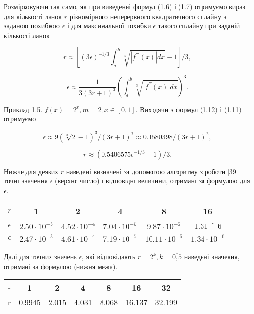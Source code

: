\documentclass[ukrainian,14pt]{extarticle}
\begin{document}
Розмірковуючи так само, як при виведенні формул (1.6) і (1.7) отримуємо вираз для кількості ланок $r$ рівномірного неперервного квадратичного сплайну з заданою похибкою $\epsilon$ і для максимальної похибки $\epsilon$ такого сплайну при заданій кількості ланок

$$r \approx \left[  (3\epsilon)^{-1/3} \int_a^b \sqrt[3]{|f^{'''}(x)| dx} - 1   \right] / 3 ,$$

$$\epsilon \approx \frac{1}{3(3r + 1)^3} \left( \int_a^b \sqrt[3]{|f^{'''}(x)| dx} \right)^3.$$

Приклад 1.5. $f(x) = 2^x, m = 2, x \in [0,1].$ Виходячи з формул (1.12) і (1.11) отримуємо

$$\epsilon \approx 9(\sqrt[3]{2} - 1)^3 / (3r + 1)^3 \approx 0.1580398 / (3r + 1)^3,$$

$$r \approx (0.5406575 \epsilon^{-1/3} - 1) / 3.$$

Нижче для деяких $r$ наведені визначені за допомогою алгоритму з роботи [39] точні значення $\epsilon$ (верхнє число) і відповідні величини, отримані за формулою для $\epsilon$.

\bgroup
\def\arraystretch{1.5}
\begin{center}
\begin{tabular}{ c | c |
c | c | c | c}
 $r$ & 1 & 2 & 4 & 8 & 16 \\
 \hline
 $\epsilon$ & $2.50 \cdot 10^{-3}$ & $4.52 \cdot 10^{-4}$ & $7.04 \cdot 10^{-5}$ & $9.87 \cdot 10^{-6}$ & 1.31 \cdot 10^{-6} \\  
 \hline
  $\epsilon$ & $2.47 \cdot 10^{-3}$ & $4.61 \cdot 10^{-4}$ & $7.19 \cdot 10^{-5}$ & $10.11 \cdot 10^{-6}$ & $1.34 \cdot 10^{-6}$ \\  
\end{tabular}
\end{center}
\egroup

Далі для точних значень $\epsilon$, які відповідають $r = 2^k, k = \overline{0, 5}$ наведені значення, отримані за формулою (нижня межа).

\bgroup
\def\arraystretch{1.5}
\begin{center}
\begin{tabular}{ c | c |
c | c | c | c | c}
 - & 1 & 2 & 4 & 8 & 16 & 32 \\
 \hline
 r & 0.9945 & 2.015 & 4.031 & 8.068 & 16.137 & 32.199 \\  

\end{tabular}
\end{center}
\egroup
\end{document}
